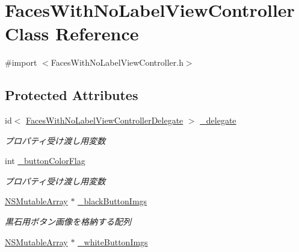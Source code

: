 \hypertarget{interface_faces_with_no_label_view_controller}{
\section{FacesWithNoLabelViewController Class Reference}
\label{interface_faces_with_no_label_view_controller}
}


{\ttfamily \#import $<$FacesWithNoLabelViewController.h$>$}

\subsection*{Protected Attributes}
\begin{DoxyCompactItemize}
\item 
\hypertarget{interface_faces_with_no_label_view_controller_ad93c8faea945b3c48b94f055c6375178}{
id$<$ \hyperlink{protocol_faces_with_no_label_view_controller_delegate-p}{FacesWithNoLabelViewControllerDelegate} $>$ \hyperlink{interface_faces_with_no_label_view_controller_ad93c8faea945b3c48b94f055c6375178}{\_\-delegate}}
\label{interface_faces_with_no_label_view_controller_ad93c8faea945b3c48b94f055c6375178}

\begin{DoxyCompactList}\small\item\em プロパティ受け渡し用変数 \end{DoxyCompactList}\item 
\hypertarget{interface_faces_with_no_label_view_controller_a480a3518426001503da6c3dbff060a73}{
int \hyperlink{interface_faces_with_no_label_view_controller_a480a3518426001503da6c3dbff060a73}{\_\-buttonColorFlag}}
\label{interface_faces_with_no_label_view_controller_a480a3518426001503da6c3dbff060a73}

\begin{DoxyCompactList}\small\item\em プロパティ受け渡し用変数 \end{DoxyCompactList}\item 
\hypertarget{interface_faces_with_no_label_view_controller_ac53192172530e4a03456d06574c16679}{
\hyperlink{class_n_s_mutable_array}{NSMutableArray} $\ast$ \hyperlink{interface_faces_with_no_label_view_controller_ac53192172530e4a03456d06574c16679}{\_\-blackButtonImgs}}
\label{interface_faces_with_no_label_view_controller_ac53192172530e4a03456d06574c16679}

\begin{DoxyCompactList}\small\item\em 黒石用ボタン画像を格納する配列 \end{DoxyCompactList}\item 
\hypertarget{interface_faces_with_no_label_view_controller_a7ec6a400202ad38ede4512bcd1e0f75a}{
\hyperlink{class_n_s_mutable_array}{NSMutableArray} $\ast$ \hyperlink{interface_faces_with_no_label_view_controller_a7ec6a400202ad38ede4512bcd1e0f75a}{\_\-whiteButtonImgs}}
\label{interface_faces_with_no_label_view_controller_a7ec6a400202ad38ede4512bcd1e0f75a}


\end{DoxyCompactItemize}
